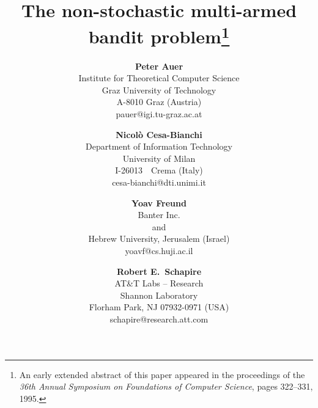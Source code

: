 \documentclass[12pt]{article}
\begin{document}
\title{\Large\bf
The non-stochastic multi-armed bandit problem\thanks{
An early extended abstract of this paper appeared in the proceedings of
the {\em 36th Annual Symposium on Foundations of Computer Science},
pages 322--331, 1995.
}}


\author{
{\bf Peter Auer}\\
\normalsize Institute for Theoretical Computer Science\\
\normalsize Graz University of Technology\\
\normalsize A-8010 Graz (Austria)\\
\normalsize pauer@igi.tu-graz.ac.at
\and
{\bf Nicol\`o Cesa-Bianchi}\\
\normalsize Department of Information Technology\\
\normalsize University of Milan\\
\normalsize I-26013~~Crema (Italy)\\
\normalsize cesa-bianchi@dti.unimi.it
\and
{\bf Yoav Freund}\\
\normalsize Banter Inc.\\ 
\normalsize and\\ 
\normalsize Hebrew University,
\normalsize Jerusalem (Israel)\\ 
\normalsize yoavf@cs.huji.ac.il 
\and
{\bf Robert E.\ Schapire}\\
\normalsize AT\&T Labs -- Research\\
\normalsize Shannon Laboratory\\
\normalsize Florham Park, NJ 07932-0971 (USA)\\
\normalsize schapire@research.att.com
}


\maketitle

\thispagestyle{empty}
\end{document}
